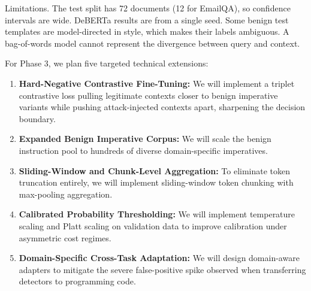 \documentclass[10pt,conference]{IEEEtran}
\begin{document}
Limitations. The test split has 72 documents (12 for EmailQA), so confidence intervals are wide. DeBERTa results are from a single seed. Some benign test templates are model-directed in style, which makes their labels ambiguous. A bag-of-words model cannot represent the divergence between query and context.

For Phase 3, we plan five targeted technical extensions:
\begin{enumerate}
    \item \textbf{Hard-Negative Contrastive Fine-Tuning:} We will implement a triplet contrastive loss pulling legitimate contexts closer to benign imperative variants while pushing attack-injected contexts apart, sharpening the decision boundary.
    \item \textbf{Expanded Benign Imperative Corpus:} We will scale the benign instruction pool to hundreds of diverse domain-specific imperatives.
    \item \textbf{Sliding-Window and Chunk-Level Aggregation:} To eliminate token truncation entirely, we will implement sliding-window token chunking with max-pooling aggregation.
    \item \textbf{Calibrated Probability Thresholding:} We will implement temperature scaling and Platt scaling on validation data to improve calibration under asymmetric cost regimes.
    \item \textbf{Domain-Specific Cross-Task Adaptation:} We will design domain-aware adapters to mitigate the severe false-positive spike observed when transferring detectors to programming code.
\end{enumerate}
\end{document}
